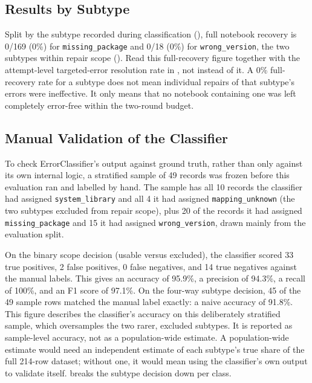 \FloatBarrier
\subsection{Results by Subtype}
\label{sec:v-final-subtype}

Split by the subtype recorded during classification
(), full notebook recovery is 0/169 (0\%) for
\texttt{missing\_package} and 0/18 (0\%) for \texttt{wrong\_version}, the
two subtypes within repair scope (). Read
this full-recovery figure together with the attempt-level
targeted-error resolution rate in , not
instead of it. A 0\% full-recovery rate for a subtype does not mean
individual repairs of that subtype's errors were ineffective. It only
means that no notebook containing one was left completely error-free
within the two-round budget.

\subsection{Manual Validation of the Classifier}
\label{sec:v-final-classifier}

To check ErrorClassifier's output against ground truth, rather than only
against its own internal logic, a stratified sample of 49 records was
frozen before this evaluation ran and labelled by hand. The sample has
all 10 records the classifier had assigned \texttt{system\_library} and
all 4 it had assigned \texttt{mapping\_unknown} (the two subtypes
excluded from repair scope), plus 20 of the records it had assigned
\texttt{missing\_package} and 15 it had assigned \texttt{wrong\_version},
drawn mainly from the evaluation split.

On the binary scope decision (usable versus excluded), the classifier
scored 33 true positives, 2 false positives, 0 false negatives, and 14
true negatives against the manual labels. This gives an accuracy of
95.9\%, a precision of 94.3\%, a recall of 100\%, and an F1 score of
97.1\%. On the four-way subtype decision, 45 of the 49 sample rows
matched the manual label exactly: a naive accuracy of 91.8\%. This
figure describes the classifier's accuracy on this deliberately
stratified sample, which oversamples the two rarer, excluded subtypes.
It is reported as sample-level accuracy, not as a population-wide
estimate. A population-wide estimate would need an independent estimate
of each subtype's true share of the full 214-row dataset; without one,
it would mean using the classifier's own output to validate itself.
 breaks the subtype decision down per class.


